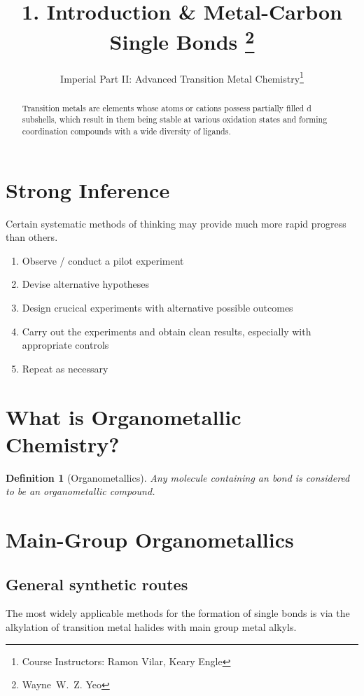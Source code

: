 \documentclass[a4paper]{tufte-handout}
\title{1. Introduction \& Metal-Carbon Single Bonds \thanks{Wayne~W.~Z. Yeo}}
\author[MIT 5.60]{\textnormal{Imperial Part II:} Advanced Transition Metal Chemistry\thanks{Course Instructors: Ramon Vilar, Keary Engle}}
\newtheorem{definition}{Definition}
\begin{document}
\maketitle %

\begin{abstract}
\noindent
Transition metals are elements whose atoms or cations possess partially filled d subshells, which result
in them being stable at various oxidation states and forming coordination compounds with a wide diversity of
ligands.
\end{abstract}


\section*{Strong Inference}
Certain systematic methods of thinking may provide much more rapid progress than others.

\begin{enumerate}
  \item Observe / conduct a pilot experiment
  \item Devise alternative hypotheses 
  \item Design crucical experiments with alternative possible outcomes
  \item Carry out the experiments and obtain clean results, especially with appropriate controls
  \item Repeat as necessary
\end{enumerate}

\section*{What is Organometallic Chemistry?}

\begin{definition}[Organometallics] 
  Any molecule containing an  bond is considered to be an organometallic compound. 
\end{definition}

\section*{Main-Group Organometallics}

\subsection*{General synthetic routes}
The most widely applicable methods for the formation of  single bonds
is via the alkylation of transition metal halides with main group metal alkyls.
\end{document}
